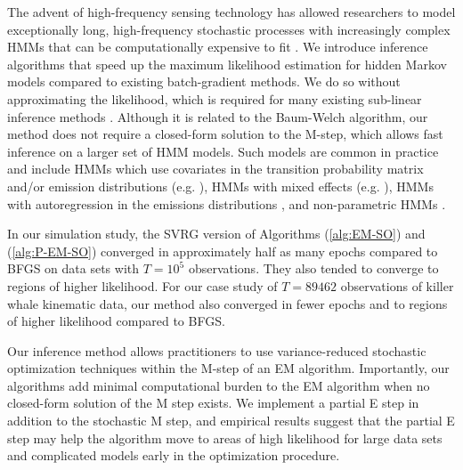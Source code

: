 
The advent of high-frequency sensing technology has allowed researchers to model exceptionally long, high-frequency stochastic processes with increasingly complex HMMs that can be computationally expensive to fit \citep{Patterson:2017}.
%
We introduce inference algorithms that speed up the maximum likelihood estimation for hidden Markov models compared to existing batch-gradient methods. We do so without approximating the likelihood, which is required for many existing sub-linear inference methods \citep{Gotoh:1998,Ye:2017}. Although it is related to the Baum-Welch algorithm, our method does not require a closed-form solution to the M-step, which allows fast inference on a larger set of HMM models. Such models are common in practice and include HMMs which use covariates in the transition probability matrix and/or emission distributions (e.g. \citet{Pirotta:2018}), HMMs with mixed effects (e.g. \citet{McClintock:2021}), HMMs with autoregression in the emissions distributions \citep{Lawler:2019}, and non-parametric HMMs \citep{Langrock:2018}. 

In our simulation study, the SVRG version of Algorithms (\ref{alg:EM-SO}) and (\ref{alg:P-EM-SO}) converged in approximately half as many epochs compared to BFGS on data sets with $T=10^{5}$ observations. They also tended to converge to regions of higher likelihood. For our case study of $T = 89462$ observations of killer whale kinematic data, our method also converged in fewer epochs and to regions of higher likelihood compared to BFGS.

Our inference method allows practitioners to use variance-reduced stochastic optimization techniques within the M-step of an EM algorithm. Importantly, our algorithms add minimal computational burden to the EM algorithm when no closed-form solution of the M step exists. We implement a partial E step in addition to the stochastic M step, and empirical results suggest that the partial E step may help the algorithm move to areas of high likelihood for large data sets and complicated models early in the optimization procedure.


